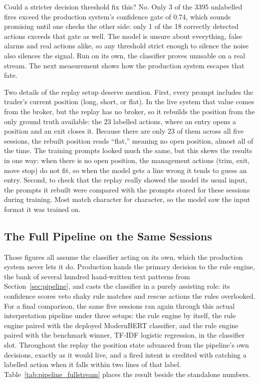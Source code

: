 Could a stricter decision threshold fix this? No. Only 3 of the 3395 unlabelled fires exceed the production system's confidence gate of 0.74, which sounds promising until one checks the other side: only 1 of the 18 correctly detected actions exceeds that gate as well. The model is unsure about everything, false alarms and real actions alike, so any threshold strict enough to silence the noise also silences the signal. Run on its own, the classifier proves unusable on a real stream. The next measurement shows how the production system escapes that fate.

Two details of the replay setup deserve mention. First, every prompt includes the trader's current position (long, short, or flat). In the live system that value comes from the broker, but the replay has no broker, so it rebuilds the position from the only ground truth available: the 23 labelled actions, where an entry opens a position and an exit closes it. Because there are only 23 of them across all five sessions, the rebuilt position reads ``flat,'' meaning no open position, almost all of the time. The training prompts looked much the same, but this skews the results in one way: when there is no open position, the management actions (trim, exit, move stop) do not fit, so when the model gets a line wrong it tends to guess an entry. Second, to check that the replay really showed the model its usual input, the prompts it rebuilt were compared with the prompts stored for these sessions during training. Most match character for character, so the model saw the input format it was trained on.

\subsection{The Full Pipeline on the Same Sessions}
\label{sec:fullstream_pipeline}

Those figures all assume the classifier acting on its own, which the production system never lets it do. Production hands the primary decision to the rule engine, the bank of several hundred hand-written text patterns from Section~\ref{sec:pipeline}, and casts the classifier in a purely assisting role: its confidence scores veto shaky rule matches and rescue actions the rules overlooked. For a final comparison, the same five sessions ran again through this actual interpretation pipeline under three setups: the rule engine by itself, the rule engine paired with the deployed ModernBERT classifier, and the rule engine paired with the benchmark winner, TF-IDF logistic regression, in the classifier slot. Throughout the replay the position state advanced from the pipeline's own decisions, exactly as it would live, and a fired intent is credited with catching a labelled action when it falls within two lines of that label. Table~\ref{tab:pipeline_fullstream} places the result beside the standalone numbers.

